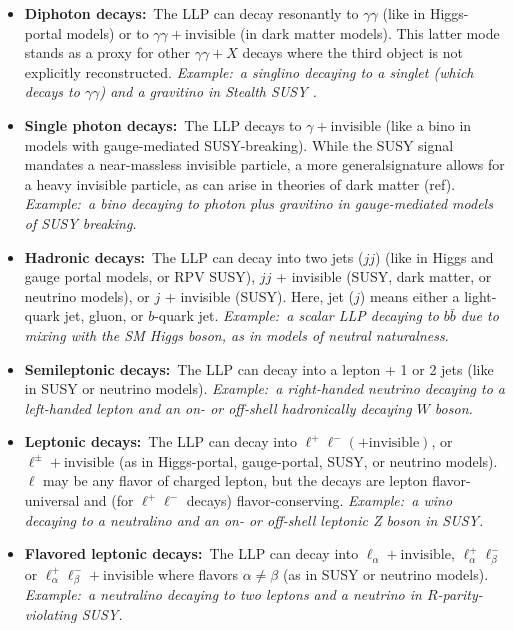\begin{itemize}
\item {\bf Diphoton decays:}~The LLP can decay resonantly to
  $\gamma\gamma$ (like in Higgs-portal models) or to
  $\gamma\gamma+\mathrm{invisible}$ (in dark matter models). This
  latter mode stands as a proxy for other $\gamma\gamma+X$ decays
  where the third object is not explicitly reconstructed. \emph{Example:~a 
  singlino decaying to a singlet (which decays to $\gamma\gamma$) and 
  a gravitino in Stealth SUSY \cite{Fan:2011yu}.}

\item {\bf Single photon decays:}~The LLP decays to
  $\gamma+\mathrm{invisible}$ (like a bino in models with
  gauge-mediated SUSY-breaking).  While the SUSY signal mandates a
  near-massless invisible particle, a more generalsignature allows for
  a heavy invisible particle, as can arise in theories of dark matter
  (ref). \emph{Example:~a bino decaying to photon plus gravitino in gauge-mediated
  models of SUSY breaking.}

\item {\bf Hadronic decays:}~The LLP can decay into two jets ($jj$)
  (like in Higgs and gauge portal models, or RPV SUSY), $jj$ +
  invisible (SUSY, dark matter, or neutrino models), or $j$ +
  invisible (SUSY). Here, jet ($j$) means either a light-quark jet,
  gluon, or $b$-quark jet. \emph{Example:~a scalar LLP decaying to $b\bar{b}$
  due to mixing with the SM Higgs boson, as in models of
  neutral naturalness}. 

\item {\bf Semileptonic decays:}~The LLP can decay into a lepton + 1
  or 2 jets (like in SUSY or neutrino models). \emph{Example:~a right-handed neutrino decaying to a left-handed
   lepton and an on- or off-shell hadronically decaying $W$ boson. }

\item {\bf Leptonic decays:}~The LLP can decay into
  $\ell^+\ell^-(+\mathrm{invisible})$, or
  $\ell^\pm+\mathrm{invisible}$ (as in Higgs-portal, gauge-portal,
  SUSY, or neutrino models). $\ell$ may be any flavor of charged
  lepton, but the decays are lepton flavor-universal and (for
  $\ell^+\ell^-$ decays) flavor-conserving. \emph{Example:~a wino decaying
  to a neutralino and an on- or off-shell leptonic Z boson in SUSY.}

\item {\bf Flavored leptonic decays:}~The LLP can decay into
  $\ell_\alpha+\mathrm{invisible}$, $\ell_\alpha^+\ell_\beta^-$ or
  $\ell_\alpha^+\ell_\beta^-+\mathrm{invisible}$ where flavors
  $\alpha\neq\beta$ (as in SUSY or neutrino models). \emph{Example:~a neutralino decaying to two
   leptons and a neutrino in $R$-parity-violating SUSY.}
\end{itemize}

